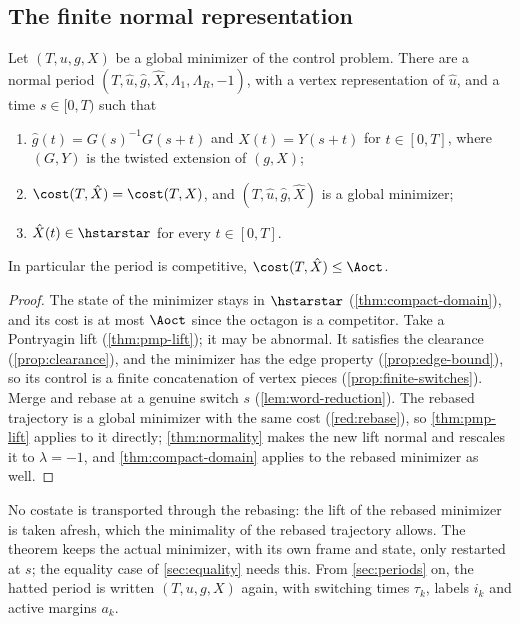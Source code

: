 \subsection{The finite normal representation}\label{red:assembly}

\begin{theorem}\label{thm:finite-normal}
Let $(T,u,g,X)$ be a global minimizer of the control problem. There are a normal period
$(T,\hat u,\hat g,\hat X,\Lambda_1,\Lambda_R,-1)$, with a vertex representation of $\hat u$, and a
time $s\in[0,T)$ such that
\begin{enumerate}
\item $\hat g(t)=G(s)^{-1}G(s+t)$ and $\hat X(t)=Y(s+t)$ for $t\in[0,T]$, where $(G,Y)$ is the
  twisted extension of $(g,X)$;
\item $\cost(T,\hat X)=\cost(T,X)$, and $(T,\hat u,\hat g,\hat X)$ is a global minimizer;
\item $\hat X(t)\in\hstarstar$ for every $t\in[0,T]$.
\end{enumerate}
In particular the period is competitive,
$\cost(T,\hat X)\le\Aoct$.
\end{theorem}

\begin{proof}
The state of the minimizer stays in $\hstarstar$ (\cref{thm:compact-domain}), and its cost is at
most $\Aoct$ since the octagon is a competitor. Take a Pontryagin lift (\cref{thm:pmp-lift}); it may
be abnormal. It satisfies the clearance (\cref{prop:clearance}), and the minimizer has the edge
property (\cref{prop:edge-bound}), so its control is a finite concatenation of vertex pieces
(\cref{prop:finite-switches}). Merge and rebase at a genuine switch $s$ (\cref{lem:word-reduction}).
The rebased trajectory is a global minimizer with the same cost (\cref{red:rebase}), so
\cref{thm:pmp-lift} applies to it directly; \cref{thm:normality} makes the new lift normal and
rescales it to $\lambda=-1$, and \cref{thm:compact-domain} applies to the rebased minimizer as
well.
\end{proof}

No costate is transported through the rebasing: the lift of the rebased minimizer is taken afresh,
which the minimality of the rebased trajectory allows. The theorem keeps the actual minimizer, with
its own frame and state, only restarted at $s$; the equality case of \cref{sec:equality} needs
this. From \cref{sec:periods} on, the hatted period is written $(T,u,g,X)$ again, with switching
times $\tau_k$, labels $i_k$ and active margins $a_k$.
